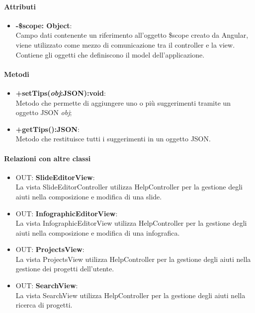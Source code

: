 	\paragraph{Attributi}
	\begin{itemize}
		\item \textbf{-\$scope: Object}:\\
				Campo dati contenente un riferimento all'oggetto \$scope creato da Angular, viene utilizzato come mezzo di comunicazione tra il controller e la view. Contiene gli oggetti che definiscono il model dell'applicazione.
	\end{itemize}
	
	\paragraph{Metodi}
	\begin{itemize}
	  \item \textbf{+setTips(\textit{obj}:JSON):void}:\\
		  Metodo che permette di aggiungere uno o più suggerimenti tramite un oggetto JSON \textit{obj};
	  \item \textbf{+getTips():JSON}:\\
		  Metodo che restituisce tutti i suggerimenti in un oggetto JSON.
	\end{itemize}
	\paragraph{Relazioni con altre classi}
	\begin{itemize}
	 \item OUT: \textbf{SlideEditorView}:\\
		La vista SlideEditorController utilizza HelpController per la gestione degli aiuti nella composizione e modifica di una slide.
	 \item OUT: \textbf{InfographicEditorView}:\\
		La vista InfographicEditorView utilizza HelpController per la gestione degli aiuti nella composizione e modifica di una infografica.
	 \item OUT: \textbf{ProjectsView}:\\
		La vista ProjectsView utilizza HelpController per la gestione degli aiuti nella gestione dei progetti dell'utente.
	 \item OUT: \textbf{SearchView}:\\
		La vista SearchView utilizza HelpController per la gestione degli aiuti nella ricerca di progetti.
	\end{itemize}


